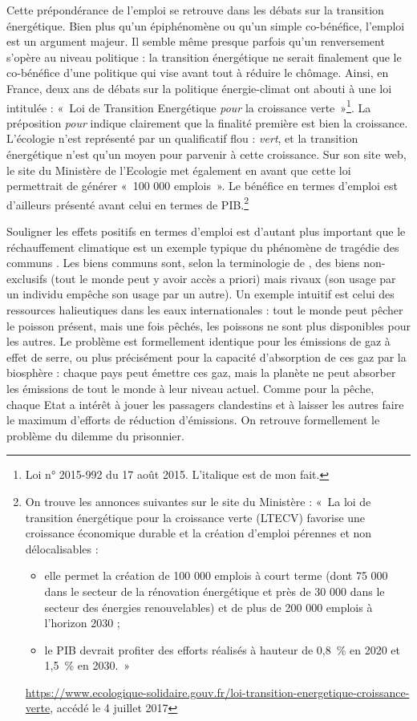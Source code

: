 Cette prépondérance de l'emploi se retrouve dans les débats sur la transition énergétique. Bien plus qu’un épiphénomène ou qu’un simple co-bénéfice, l’emploi est un argument majeur. Il semble même presque parfois qu’un renversement s’opère au niveau politique : la transition énergétique ne serait finalement que le co-bénéfice d’une politique qui vise avant tout à réduire le chômage. Ainsi, en France, deux ans de débats sur la politique énergie-climat ont abouti à une loi intitulée : «~Loi de Transition Energétique \textit{pour} la croissance verte~»\footnote{Loi n° 2015-992 du 17 août 2015. L'italique est de mon fait.
}. La préposition \textit{pour} indique clairement que la finalité première est bien la croissance. L'écologie n'est représenté par un qualificatif flou : \textit{vert}, et la transition énergétique n'est qu'un moyen pour parvenir à cette croissance. 
Sur son site web, le site du Ministère de l'Ecologie met également en avant que cette loi permettrait de générer «~100 000 emplois~». Le bénéfice en termes d'emploi est d'ailleurs présenté avant celui en termes de PIB.\footnote{On trouve les annonces suivantes sur le site du Ministère : «~La loi de transition énergétique pour la croissance verte (LTECV) favorise une croissance économique durable et la création d'emploi pérennes et non délocalisables :
\begin{itemize}
	\item elle permet la création de 100 000 emplois à court terme (dont 75 000 dans le secteur de la rénovation énergétique et près de 30 000 dans le secteur des énergies renouvelables) et de plus de 200 000 emplois à l’horizon 2030 ;
	\item le PIB devrait profiter des efforts réalisés à hauteur de 0,8~\% en 2020 et 1,5~\% en 2030.~»
\end{itemize}
\url{https://www.ecologique-solidaire.gouv.fr/loi-transition-energetique-croissance-verte}, accédé le 4 juillet 2017
}

Souligner les effets positifs en termes d’emploi est d’autant plus important que le réchauffement climatique est un exemple typique du phénomène de tragédie des communs \citep{Hardin1968}. Les biens communs sont, selon la terminologie de \citet{Samuelson1954}, des biens non-exclusifs (tout le monde peut y avoir accès a priori) mais rivaux (son usage par un individu empêche son usage par un autre). Un exemple intuitif est celui des ressources halieutiques dans les eaux internationales : tout le monde peut pêcher le poisson présent, mais une fois pêchés, les poissons ne sont plus disponibles pour les autres.
Le problème est formellement identique pour les émissions de gaz à effet de serre, ou plus précisément pour la capacité d'absorption de ces gaz par la biosphère : chaque pays peut émettre ces gaz, mais la planète ne peut absorber les émissions de tout le monde à leur niveau actuel.
Comme pour la pêche, chaque Etat a intérêt à jouer les passagers clandestins et à laisser les autres faire le maximum d’efforts de réduction d'émissions. On retrouve formellement le problème du dilemme du prisonnier.


